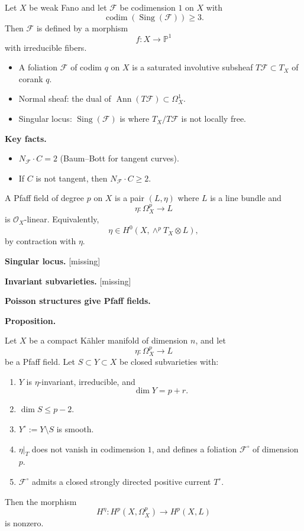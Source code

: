 \begin{theorem}
\label{theorem-dppt-int}
Let $X$ be weak Fano and let
$\mathcal F$ be codimension $1$ on
$X$ with
$$
\operatorname{codim}
(\operatorname{Sing}(\mathcal F))
\geq 3.
$$
Then $\mathcal F$ is defined by a
morphism
$$
f:X\to \mathbb{P}^1
$$
with irreducible fibers.
\end{theorem}

\begin{itemize}
\item A foliation $\mathcal F$ of codim
$q$ on $X$ is a saturated involutive
subsheaf
$T\mathcal F\subset T_X$ of corank $q$.
\item Normal sheaf: the dual of
$\operatorname{Ann}(T\mathcal F)
\subset \Omega_X^1$.
\item Singular locus:
$\operatorname{Sing}(\mathcal F)$ is
where $T_X/T\mathcal F$ is not locally
free.
\end{itemize}

\medskip\noindent
{\bf Key facts.}

\begin{itemize}
\item $N_{\mathcal F}\cdot C=2$
(Baum--Bott for tangent curves).
\item If $C$ is not tangent, then
$N_{\mathcal F}\cdot C\geq 2$.
\end{itemize}

\begin{definition}
A Pfaff field of degree $p$ on $X$ is
a pair $(L,\eta)$ where $L$ is a line
bundle and
$$
\eta:\Omega_X^p\to L
$$
is $\mathcal O_X$-linear.
Equivalently,
$$
\eta\in H^0(X,\wedge^p T_X\otimes L),
$$
by contraction with $\eta$.
\end{definition}

\medskip\noindent
{\bf Singular locus.} [missing]

\medskip\noindent
{\bf Invariant subvarieties.} [missing]

\medskip\noindent
{\bf Poisson structures give Pfaff
fields.}

\medskip\noindent
{\bf Proposition.}

Let $X$ be a compact K\"ahler manifold
of dimension $n$, and let
$$
\eta:\Omega_X^p\to L
$$
be a Pfaff field.
Let $S\subset Y\subset X$ be closed
subvarieties with:
\begin{enumerate}
\item $Y$ is $\eta$-invariant,
irreducible, and
$$
\dim Y=p+r.
$$
\item $\dim S\leq p-2$.
\item $Y^\circ:=Y\setminus S$ is
smooth.
\item $\eta|_T$ does not vanish in
codimension $1$, and defines a
foliation $\mathcal F^\circ$ of
dimension $p$.
\item $\mathcal F^\circ$ admits a
closed strongly directed positive
current $T^\circ$.
\end{enumerate}
Then the morphism
$$
H^\eta:H^p(X,\Omega_X^p)\to H^p(X,L)
$$
is nonzero.

